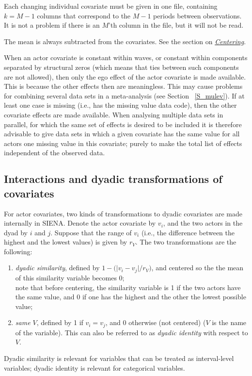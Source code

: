 \documentclass[a4paper,fleqn]{article}
\newcommand{\+}{\, + \,}
\newcommand{\si}{{\sf SIENA}}
\begin{document}
{Each changing individual covariate must be given in one file,
containing $k = M-1$ columns that correspond to the $M-1$ periods
between observations.
It is not a problem if there is an $M$'th column in the file,
but it will not be read.

The mean is always subtracted from the covariates.
See the section on \hyperlink{T_S_centering}{\emph{Centering}}.

When an actor covariate is constant within waves, or constant
within components separated by structural zeros (which means that
ties between such components are not allowed), then only the ego effect
of the actor covariate is made available.
This is because the other effects then are meaningless.
This may cause problems for combining several data sets
in a meta-analysis (see Section ~\ref{S_mulev}).
If at least one case is missing (i.e., has the missing value data code),
then the other covariate effects are made available.
When analysing multiple data sets in parallel,
for which the same set of effects is desired to be included %
it is therefore advisable to give data sets in which
a given covariate has the same value for all actors
one missing value in this covariate;
purely to make
the total list of effects %
independent of the observed data.


\subsection{Interactions and dyadic transformations of covariates}

For actor covariates, two kinds of transformations to dyadic covariates
are made internally in \si. Denote the actor covariate by $v_i$,
and the two actors in the dyad by $i$ and $j$.
Suppose that the range of $v_i$ (i.e., the difference between the
highest and the lowest values) is given by $r_V$.
The two transformations are the following:
\begin{enumerate}
\item \emph{dyadic similarity}, defined by $ 1 - \big( \vert v_i - v_j \vert / r_V \big) $,
      and centered so the the mean of this similarity variable becomes 0;\\
      note that before centering, the similarity variable is 1 if
      the two actors have the same value, and 0 if one has the highest and the
      other the lowest possible value;
\item \emph{same $V$}, defined by 1 if $v_i = v_j$,
      and 0 otherwise (not centered) ($V$ is the name of the variable).
      This can also be referred to as \emph{dyadic identity} with respect to $V$.
\end{enumerate}
Dyadic similarity is relevant for variables that can be treated as interval-level
variables; dyadic identity is relevant for categorical variables.


}
\end{document}
